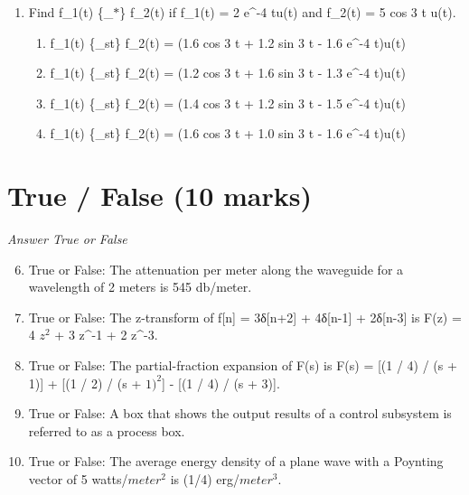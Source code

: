 \documentclass[12pt]{article}
\begin{document}
\begin{enumerate}[label=\arabic*.]
\begin{enumerate}[label=(\alph*)]
    \item 2.25 bits/message
    \item 1.75 bits/message
    \item 3.00 bits/message
    \item 2.75 bits/message
\end{enumerate}
\item Find f\_1(t) \{\_\ensuremath{\ast}\} f\_2(t) if f\_1(t) = 2 e^-4 tu(t) and f\_2(t) = 5 cos 3 t u(t).
\begin{enumerate}[label=(\alph*)]
    \item f\_1(t) \{\_st\} f\_2(t) = (1.6 cos 3 t + 1.2 sin 3 t - 1.6 e^-4 t)u(t)
    \item f\_1(t) \{\_st\} f\_2(t) = (1.2 cos 3 t + 1.6 sin 3 t - 1.3 e^-4 t)u(t)
    \item f\_1(t) \{\_st\} f\_2(t) = (1.4 cos 3 t + 1.2 sin 3 t - 1.5 e^-4 t)u(t)
    \item f\_1(t) \{\_st\} f\_2(t) = (1.6 cos 3 t + 1.0 sin 3 t - 1.6 e^-4 t)u(t)
\end{enumerate}
\end{enumerate}

\section*{True / False (10 marks)}
\textit{Answer True or False}
\begin{enumerate}[label=\arabic*.]
\setcounter{enumi}{5}
\item True or False: The attenuation per meter along the waveguide for a wavelength of 2 meters is 545 db/meter.
\item True or False: The z-transform of f[n] = 3δ[n+2] + 4δ[n-1] + 2δ[n-3] is F(z) = 4 $z^2$ + 3 z^-1 + 2 z^-3.
\item True or False: The partial-fraction expansion of F(s) is F(s) = [(1 / 4) / (s + 1)] + [(1 / 2) / (s + $1)^2$] - [(1 / 4) / (s + 3)].
\item True or False: A box that shows the output results of a control subsystem is referred to as a process box.
\item True or False: The average energy density of a plane wave with a Poynting vector of 5 watts/$meter^2$ is (1/4) erg/$meter^3$.
\end{enumerate}
\end{document}
